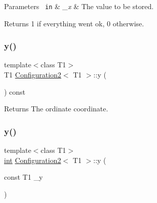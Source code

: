 \begin{DoxyParams}[1]{Parameters}
\mbox{\texttt{ in}}  & {\em \+\_\+x} & The value to be stored. \\
\hline
\end{DoxyParams}
\begin{DoxyReturn}{Returns}
1 if everything went ok, 0 otherwise. 
\end{DoxyReturn}
\mbox{\label{class_configuration2_a6f92f5478bb05304dae587203c8de9c1}} 
\subsubsection{\texorpdfstring{y()}{y()}\hspace{0.1cm}{\footnotesize\ttfamily [1/2]}}
{\footnotesize\ttfamily template$<$class T1$>$ \\
T1 \mbox{\hyperlink{class_configuration2}{Configuration2}}$<$ T1 $>$\+::y (\begin{DoxyParamCaption}{ }\end{DoxyParamCaption}) const\hspace{0.3cm}{\ttfamily [inline]}}

\begin{DoxyReturn}{Returns}
The ordinate coordinate. 
\end{DoxyReturn}
\mbox{\label{class_configuration2_a6cc23545dd1c7d17aa32c96126f1f727}} 
\subsubsection{\texorpdfstring{y()}{y()}\hspace{0.1cm}{\footnotesize\ttfamily [2/2]}}
{\footnotesize\ttfamily template$<$class T1$>$ \\
\mbox{\hyperlink{draw_8hh_aa620a13339ac3a1177c86edc549fda9b}{int}} \mbox{\hyperlink{class_configuration2}{Configuration2}}$<$ T1 $>$\+::y (\begin{DoxyParamCaption}\item[{const T1}]{\+\_\+y }\end{DoxyParamCaption})\hspace{0.3cm}{\ttfamily [inline]}}



